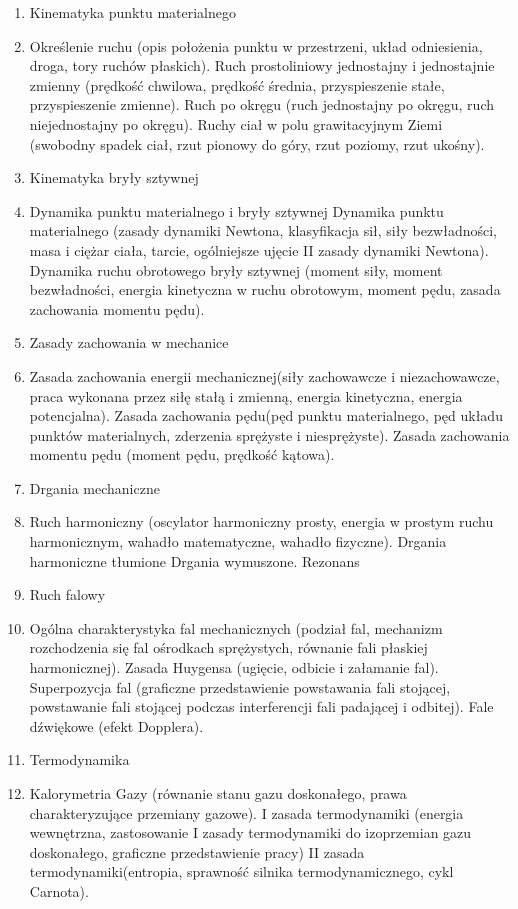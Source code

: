 \documentclass[12pt, a4paper]{article}
\begin{document}
\begin{enumerate}
  \item Kinematyka punktu materialnego
  \item Określenie ruchu (opis położenia punktu w przestrzeni, układ odniesienia, droga, tory ruchów płaskich). Ruch prostoliniowy jednostajny i jednostajnie zmienny (prędkość chwilowa, prędkość średnia, przyspieszenie stałe, przyspieszenie zmienne). Ruch po okręgu (ruch jednostajny po okręgu, ruch niejednostajny po okręgu). Ruchy ciał w polu grawitacyjnym Ziemi (swobodny spadek ciał, rzut pionowy do góry, rzut poziomy, rzut ukośny).
  \item Kinematyka bryły sztywnej
  \item Dynamika punktu materialnego i bryły sztywnej Dynamika punktu materialnego (zasady dynamiki Newtona, klasyfikacja sił, siły bezwładności, masa i ciężar ciała, tarcie, ogólniejsze ujęcie II zasady dynamiki Newtona). Dynamika ruchu obrotowego bryły sztywnej (moment siły, moment bezwładności, energia kinetyczna w ruchu obrotowym, moment pędu, zasada zachowania momentu pędu).
  \item Zasady zachowania w mechanice
  \item Zasada zachowania energii mechanicznej(siły zachowawcze i niezachowawcze, praca wykonana przez siłę stałą i zmienną, energia kinetyczna, energia potencjalna). Zasada zachowania pędu(pęd punktu materialnego, pęd układu punktów materialnych, zderzenia sprężyste i niesprężyste). Zasada zachowania momentu pędu (moment pędu, prędkość kątowa).
  \item Drgania mechaniczne
  \item Ruch harmoniczny (oscylator harmoniczny prosty, energia w prostym ruchu harmonicznym, wahadło matematyczne, wahadło fizyczne). Drgania harmoniczne tłumione Drgania wymuszone. Rezonans
  \item Ruch falowy
  \item Ogólna charakterystyka fal mechanicznych (podział fal, mechanizm rozchodzenia się fal ośrodkach sprężystych, równanie fali płaskiej harmonicznej). Zasada Huygensa (ugięcie, odbicie i załamanie fal). Superpozycja fal (graficzne przedstawienie powstawania fali stojącej, powstawanie fali stojącej podczas interferencji fali padającej i odbitej). Fale dźwiękowe (efekt Dopplera).
  \item Termodynamika
  \item Kalorymetria Gazy (równanie stanu gazu doskonałego, prawa charakteryzujące przemiany gazowe). I zasada termodynamiki (energia wewnętrzna, zastosowanie I zasady termodynamiki do izoprzemian gazu doskonałego, graficzne przedstawienie pracy) II zasada termodynamiki(entropia, sprawność silnika termodynamicznego, cykl Carnota).

\end{enumerate}
\end{document}
